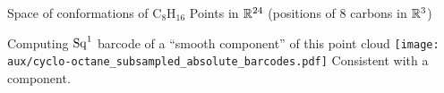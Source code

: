 \begin{frame}{Space of conformations of $\mathrm{C_8H_{16}}$}
	\pause
	Points in $\mathbb{R}^{24}$ (positions of $8$ carbons in $\mathbb{R}^3$)

	\pause\smallskip
	Computing $\operatorname{Sq}^1$ barcode of a ``smooth component'' of this point cloud
	\smallskip
	\texttt{[image: aux/cyclo-octane\_subsampled\_absolute\_barcodes.pdf]}
	Consistent with a  component.
\end{frame}

%
